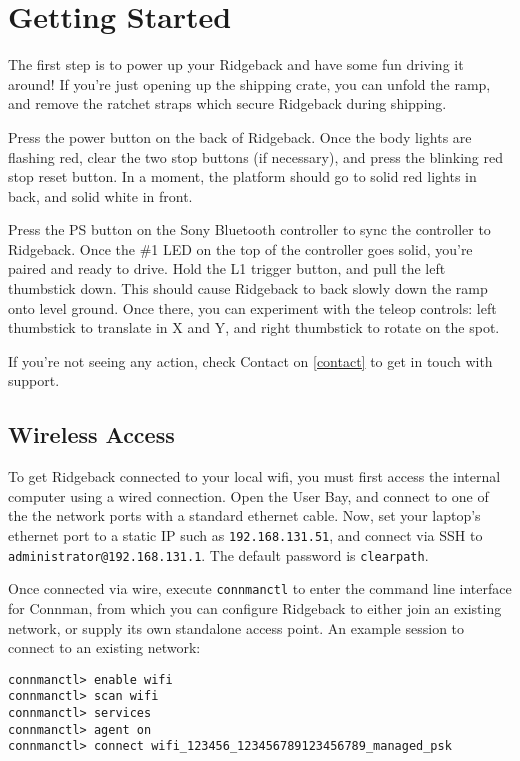 \documentclass[]{clearpath-latex/clearpath-manual}
\begin{document}
\section{Getting Started}

The first step is to power up your Ridgeback and have some fun driving it around! If you’re just opening up the shipping crate, you can unfold the ramp, and remove the ratchet straps which secure Ridgeback during shipping.

Press the power button on the back of Ridgeback. Once the body lights are flashing red, clear the two stop buttons (if necessary), and press the blinking red stop reset button. In a moment, the platform should go to solid red lights in back, and solid white in front.

Press the PS button on the Sony Bluetooth controller to sync the controller to Ridgeback. Once the \#1 LED on the top of the controller goes solid, you’re paired and ready to drive. Hold the L1 trigger button, and pull the left thumbstick down. This should cause Ridgeback to back slowly down the ramp onto level ground. Once there, you can experiment with the teleop controls: left thumbstick to translate in X and Y, and right thumbstick to rotate on the spot.

If you’re not seeing any action, check Contact on \autoref{contact} to get in touch with support.

\subsection{Wireless Access}

To get Ridgeback connected to your local wifi, you must first access the internal computer using a wired connection. Open the User Bay, and connect to one of the the network ports with a standard ethernet cable. Now, set your laptop’s ethernet port to a static IP such as \lstinline{192.168.131.51}, and connect via SSH to \lstinline{administrator@192.168.131.1}. The default password is \lstinline{clearpath}.

Once connected via wire, execute \lstinline{connmanctl} to enter the command line interface for Connman, from which you can configure Ridgeback to either join an existing network, or supply its own standalone access point. An example session to connect to an existing network:

\begin{lstlisting}
connmanctl> enable wifi
connmanctl> scan wifi
connmanctl> services
connmanctl> agent on
connmanctl> connect wifi_123456_123456789123456789_managed_psk
\end{lstlisting}
\end{document}

